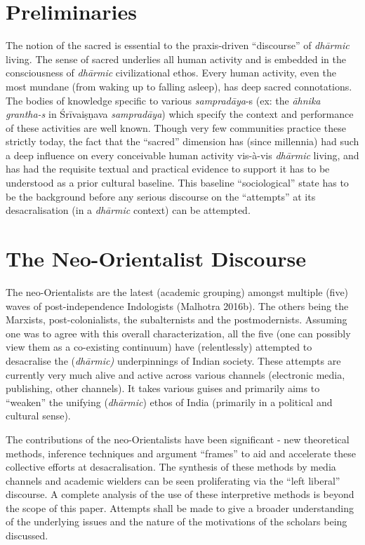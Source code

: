 \section*{Preliminaries}

The notion of the sacred is essential to the praxis-driven “discourse” of \textit{dhārmic} living. The sense of sacred underlies all human activity and is embedded in the consciousness of \textit{dhārmic} civilizational ethos. Every human activity, even the most mundane (from waking up to falling asleep), has deep sacred connotations. The bodies of knowledge specific to various \textit{sampradāya}-s (ex: the \textit{āhnika grantha-s }in Śrīvaiṣṇava \textit{sampradāya}) which specify the context and performance of these activities are well known. Though very few communities practice these strictly today, the fact that the “sacred” dimension has (since millennia) had such a deep influence on every conceivable human activity vis-à-vis \textit{dhārmic} living, and has had the requisite textual and practical evidence to support it has to be understood as a prior cultural baseline. This baseline “sociological” state has to be the background before any serious discourse on the “attempts” at its desacralisation (in a \textit{dhārmic} context) can be attempted.

\section*{The Neo-Orientalist Discourse}

The neo-Orientalists are the latest (academic grouping) amongst multiple (five) waves of post-independence Indologists (Malhotra 2016b). The others being the Marxists, post-colonialists, the subalternists and the postmodernists. Assuming one was to agree with this overall characterization, all the five (one can possibly view them as a co-existing continuum) have (relentlessly) attempted to desacralise the (\textit{dhārmic)} underpinnings of Indian society. These attempts are currently very much alive and active across various channels (electronic media, publishing, other channels). It takes various guises and primarily aims to “weaken” the unifying (\textit{dhārmic}) ethos of India (primarily in a political and cultural sense).

The contributions of the neo-Orientalists have been significant - new theoretical methods, inference techniques and argument “frames” to aid and accelerate these collective efforts at desacralisation. The synthesis of these methods by media channels and academic wielders can be seen proliferating via the “left liberal” discourse. A complete analysis of the use of these interpretive methods is beyond the scope of this paper. Attempts shall be made to give a broader understanding of the underlying issues and the nature of the motivations of the scholars being discussed.

